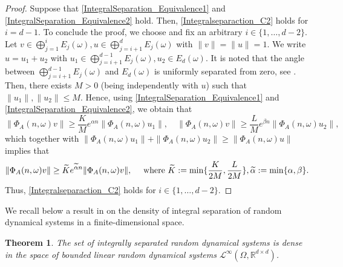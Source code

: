 \documentclass[pdflatex,sn-mathphys-num]{sn-jnl}%
\theoremstyle{thmstyleone}%
\newtheorem{theorem}{Theorem}%
\theoremstyle{thmstyletwo}%
\theoremstyle{thmstylethree}%
\newcommand{\R}{\mathbb{R}}
\newcommand{\cL}{\mathcal{L}}
\numberwithin{equation}{section}
\begin{document}
\begin{proof}
Suppose that \eqref{IntegralSeparation_Equivalence1} and \eqref{IntegralSeparation_Equivalence2} hold. Then, \eqref{Integralseparaction_C2} holds for $i=d-1$. To conclude the proof, we choose and fix an arbitrary $i\in\{1,\dots,d-2\}$. Let $v\in \bigoplus_{j=1}^i E_j(\omega), u\in \bigoplus_{j=i+1}^{d}E_{j}(\omega)$ with $\|v\|=\|u\|=1$. We write $u=u_1+u_2$ with $u_1\in \bigoplus_{j=i+1}^{d-1}E_{j}(\omega), u_2\in E_{d}(\omega)$. It is noted that the angle between $\bigoplus_{j=i+1}^{d-1}E_{j}(\omega)$ and $E_{d}(\omega)$ is uniformly separated from zero, see \cite{Cong05}. Then, there exists $M>0$ (being independently with $u$) such that $\|u_1\|,\|u_2\|\leq M$. Hence, using \eqref{IntegralSeparation_Equivalence1} and \eqref{IntegralSeparation_Equivalence2}, we obtain that 
\[
\|\Phi_A(n,\omega)v\|\geq \frac{K}{M} e^{\alpha n} \|\Phi_A(n,\omega)u_1\|,\quad  \|\Phi_A(n,\omega)v\|\geq \frac{L}{M} e^{\beta n} \|\Phi_A(n,\omega)u_2\|,
\]
which together with $\|\Phi_A(n,\omega) u_1\|+\|\Phi_A(n,\omega) u_2\|\geq \|\Phi_A(n,\omega)u\|$ implies that 
\[
\|\Phi_A(n,\omega)v\|\geq
\widetilde{K} e^{{\widetilde \alpha}n}\|\Phi_A(n,\omega)v\|,\quad \hbox{ where } \widetilde K:=\min\{\frac{K}{2M},\frac{L}{2M}\}, \widetilde \alpha:=\min\{\alpha,\beta\}.
\]
Thus, \eqref{Integralseparaction_C2} holds for  $i\in\{1,\dots,d-2\}$.
\end{proof}
%
We recall below a result in \cite{Cong05} on the density of integral separation of random dynamical systems in a finite-dimensional space.
%
\begin{theorem}\label{Density_IntegralSeparation}
The set of integrally separated random dynamical systems is dense in the space of bounded linear random dynamical systems $\cL^{\infty}(\Omega,\R^{d\times d})$. 
\end{theorem}
%
%

%
%
%
%

%
\end{document}
